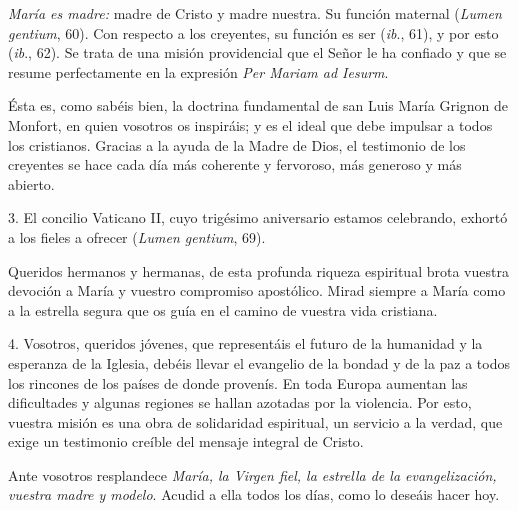 \emph{María es madre:} madre de Cristo y madre nuestra. Su función maternal  (\emph{Lumen gentium}, 60). Con respecto a los creyentes, su función es ser  (\emph{ib}., \emph{} 61), y por esto  (\emph{ib}., 62). Se trata de una misión providencial que el Señor le ha confiado y que se resume perfectamente en la expresión \emph{Per Mariam ad Iesurm}.

Ésta es, como sabéis bien, la doctrina fundamental de san Luis María Grignon de Monfort, en quien vosotros os inspiráis; y es el ideal que debe impulsar a todos los cristianos. Gracias a la ayuda de la Madre de Dios, el testimonio de los creyentes se hace cada día más coherente y fervoroso, más generoso y más abierto.

3. El concilio Vaticano II, cuyo trigésimo aniversario estamos celebrando, exhortó a los fieles a ofrecer  (\emph{Lumen gentium}, 69).

Queridos hermanos y hermanas, de esta profunda riqueza espiritual brota vuestra devoción a María y vuestro compromiso apostólico. Mirad siempre a María como a la estrella segura que os guía en el camino de vuestra vida cristiana.

4. Vosotros, queridos jóvenes, que representáis el futuro de la humanidad y la esperanza de la Iglesia, debéis llevar el evangelio de la bondad y de la paz a todos los rincones de los países de donde provenís. En toda Europa aumentan las dificultades y algunas regiones se hallan azotadas por la violencia. Por esto, vuestra misión es una obra de solidaridad espiritual, un servicio a la verdad, que exige un testimonio creíble del mensaje integral de Cristo.

Ante vosotros resplandece \emph{María, la Virgen fiel, la estrella de la evangelización, vuestra madre y modelo}. Acudid a ella todos los días, como lo deseáis hacer hoy.

